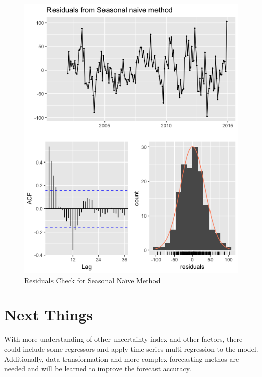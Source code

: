 \documentclass[12pt]{article}
\begin{document}
\begin{figure}[!tbp]
\begin{minipage}[b]{0.49\textwidth}
    \includegraphics[width=\textwidth]{residuals.png}
    \caption{Residuals Check for Seasonal Naïve Method}
  \end{minipage}
\end{figure}

\section{Next Things}

With more understanding of other uncertainty index and other factors, there could include some regressors and apply time-series multi-regression to the model. Additionally, data transformation and more complex forecasting methos are needed and will be learned to improve the forecast accuracy. 

\end{document}
